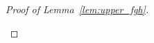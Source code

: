 \documentclass[lettersize,onecolumn,journal]{IEEEtran}
\theoremstyle{definition}
\theoremstyle{definition}
\newcommand{\of}[1]{\left(#1\right)}
\begin{document}
\begin{proof}[Proof of Lemma~\ref{lem:upper_fgh}]
\begin{enumerate}
    
    

\end{enumerate}
\end{proof}
\end{document}
